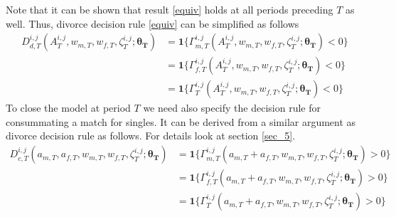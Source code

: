 Note that it can be shown that result \eqref{equiv} holds at all periods preceding $T$ as well. Thus, divorce decision rule \eqref{equiv} can be simplified as follows 
\begin{align}
D^{i,j}_{d,T} (A^{i,j}_T, w_{m,T}, w_{f,T}, \zeta^{i,j}_T; \bm{\theta_T}) &= \mathbf 1\{\Gamma_{m,T}^{i,j} (A^{i,j}_T, w_{m,T}, w_{f,T}, \zeta^{i,j}_T; \bm{\theta_T}) < 0\} \\
& = \mathbf 1\{\Gamma_{f,T}^{i,j} (A^{i,j}_T, w_{m,T}, w_{f,T}, \zeta^{i,j}_T; \bm{\theta_T}) < 0\} \nonumber \\
& = \mathbf 1\{\Gamma_{T}^{i,j} (A^{i,j}_T, w_{m,T}, w_{f,T}, \zeta^{i,j}_T; \bm{\theta_T}) < 0\} \nonumber
\end{align}
To close the model at period $T$ we need also specify the decision rule for consummating a match for singles. It can be derived from a similar argument as divorce decision rule as follows. For details look at section \ref{sec_5}. 
\begin{align}
D^{i,j}_{c,T} (a_{m,T}, a_{f,T}, w_{m,T}, w_{f,T}, \zeta^{i,j}_T; \bm{\theta_T}) &= \mathbf 1\{\Gamma_{m,T}^{i,j} (a_{m,T} + a_{f,T}, w_{m,T}, w_{f,T}, \zeta^{i,j}_T; \bm{\theta_T}) > 0\} \\
& = \mathbf 1\{\Gamma_{f,T}^{i,j} (a_{m,T} + a_{f,T},  w_{m,T}, w_{f,T}, \zeta^{i,j}_T; \bm{\theta_T}) > 0\} \nonumber \\
& = \mathbf 1\{\Gamma_{T}^{i,j} (a_{m,T} + a_{f,T},  w_{m,T}, w_{f,T}, \zeta^{i,j}_T; \bm{\theta_T}) > 0\} \nonumber
\end{align}
